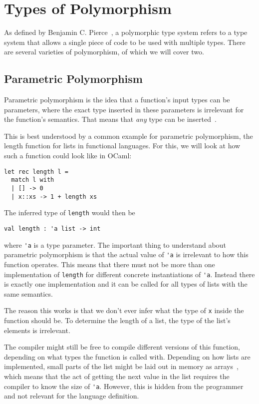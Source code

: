 \section{Types of Polymorphism}

As defined by Benjamin C. Pierce~\cite[Chapter~23.2]{pierce-types}, a polymorphic type system refers to a type system that allows a single piece of code to be used with multiple types. There are several varieties of polymorphism, of which we will cover two.

\subsection{Parametric Polymorphism}

Parametric polymorphism is the idea that a function's input types can be parameters, where the exact type inserted in these parameters is irrelevant for the function's semantics. That means that \emph{any} type can be inserted~\cite[Chapter~23.2]{pierce-types}.

This is best understood by a common example for parametric polymorphism, the length function for lists in functional languages. For this, we will look at how such a function could look like in OCaml:
\begin{verbatim}
let rec length l =
  match l with
  | [] -> 0
  | x::xs -> 1 + length xs
\end{verbatim}
The inferred type of \verb|length| would then be
\begin{verbatim}
val length : 'a list -> int
\end{verbatim}
where \verb|'a| is a type parameter. The important thing to understand about parametric polymorphism is that the actual value of \verb|'a| is irrelevant to how this function operates. This means that there must not be more than one implementation of \verb|length| for different concrete instantiations of \verb|'a|. Instead there is exactly one implementation and it can be called for all types of lists with the same semantics.

The reason this works is that we don't ever infer what the type of \verb|x| inside the function should be. To determine the length of a list, the type of the list's elements is irrelevant.

The compiler might still be free to compile different versions of this function, depending on what types the function is called with. Depending on how lists are implemented, small parts of the list might be laid out in memory as arrays~\cite{functional-lists}, which means that the act of getting the next value in the list requires the compiler to know the size of \verb|'a|. However, this is hidden from the programmer and not relevant for the language definition.

